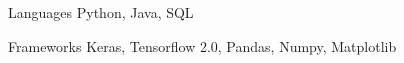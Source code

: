 
\begin{cvskills}
  \cvskill
    {Languages} %
    {Python, Java, SQL} %

  \cvskill
    {Frameworks} %
    {Keras, Tensorflow 2.0, Pandas, Numpy, Matplotlib} %
\end{cvskills}
